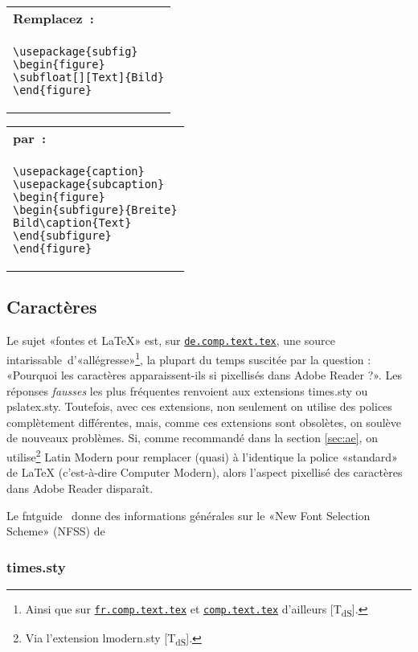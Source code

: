 \documentclass[fontsize=11pt, paper=a4, pagesize, captions=tableheading, numbers=enddot, toc=graduated, footnotes=multiple]{scrartcl}%
\makeatletter
\newcommand{\News}[1]{\href{news:#1}{\texttt{#1}}}
\newcommand{\News}[1]{\href{news:#1}{\texttt{#1}}}
\newcommand{\Doku}[1]{\textsf{#1}\xspace}
\newcommand{\Paket}[1]{\textsf{#1.sty}\xspace}
\newenvironment{Ers}[1][\linewidth]{%
  \par\bigskip\noindent\marginline{\textcolor{gruen}{\boldmath $\triangleright$}}\begin{tabular}[t]{@{}p{0.5\textwidth}@{}}\textcolor{rot}{\textbf{\textsf{Remplacez~:}}%
}\\[2pt] \rahmenpr[#1]}%
{\endrahmenpr\end{tabular}}
\newenvironment{Dur}[1][0.5\textwidth]{%
\noindent\begin{tabular}[t]{@{}p{0.5\textwidth - 0.5em}@{}}\textcolor{gruen}{\textbf{\textsf{par~:}}}\\[2pt]\rahmenpg[#1]}%
{\endrahmenpg\end{tabular}\smallskip\noindent}
\newcommand{\NDT}{[T\textsubscript{dS}].} %
\makeatother
\begin{document}
\begin{Ers}
\begin{verbatim}
\usepackage{subfig}
\begin{figure}
\subfloat[][Text]{Bild}
\end{figure}
\end{verbatim}
\end{Ers}
\begin{Dur}
\begin{verbatim}
\usepackage{caption}
\usepackage{subcaption}
\begin{figure}
\begin{subfigure}{Breite}
Bild\caption{Text}
\end{subfigure}
\end{figure}
\end{verbatim}
\end{Dur}

\subsection{Caractères}
\label{sec:schriften}

Le sujet «fontes et \LaTeX{}» est, sur \News{de.comp.text.tex}, une source intarissable~d'«allégresse»\footnote{Ainsi que sur \News{fr.comp.text.tex} et \News{comp.text.tex} d'ailleurs \NDT}, la plupart du temps suscitée par la question : «Pourquoi les caractères apparaissent-ils si pixellisés dans Adobe Reader ?». Les réponses \emph{fausses} les plus fréquentes renvoient aux extensions \Paket{times} ou \Paket{pslatex}. Toutefois, avec ces extensions, non seulement on utilise des polices complètement différentes, mais, comme ces extensions sont obsolètes, on soulève de nouveaux problèmes. Si, comme recommandé dans la section \ref{sec:ae}, on utilise\footnote{Via l’extension \Paket{lmodern} \NDT} Latin Modern pour remplacer (quasi) à l’identique la police «standard» de \LaTeX{} (c’est-à-dire Computer Modern), alors l’aspect pixellisé des caractères dans Adobe Reader disparaît.

Le \Doku{fntguide}~\cite{fntguide-05} donne des informations générales sur le «New Font Selection Scheme» (NFSS) de \LaTeXe{}

\subsubsection{\Paket{times}}
\label{sec:pakettimes}
\end{document}
